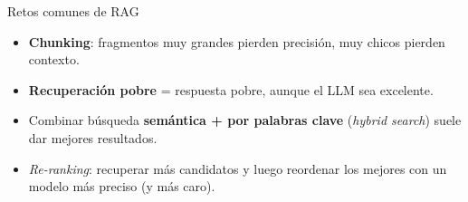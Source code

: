 \begin{frame}{Retos comunes de RAG}
  \begin{itemize}
    \item \textbf{Chunking}: fragmentos muy grandes pierden precisión, muy
      chicos pierden contexto.
    \item \textbf{Recuperación pobre} = respuesta pobre, aunque el LLM sea excelente.
    \item Combinar búsqueda \textbf{semántica + por palabras clave} (\emph{hybrid search})
      suele dar mejores resultados.
    \item \emph{Re-ranking}: recuperar más candidatos y luego reordenar los
      mejores con un modelo más preciso (y más caro).
  \end{itemize}
\end{frame}
